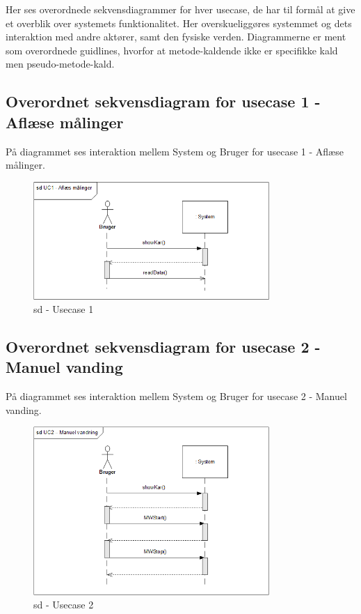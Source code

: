 
Her ses overordnede sekvensdiagrammer for hver usecase, de har til formål at give et overblik over systemets funktionalitet. Her overskueliggøres systemmet og dets interaktion med andre aktører, samt den fysiske verden.
Diagrammerne er ment som overordnede guidlines, hvorfor at metode-kaldende ikke er specifikke kald men pseudo-metode-kald. 

\subsection{Overordnet sekvensdiagram for usecase 1 - Aflæse målinger}
På diagrammet ses interaktion mellem System og Bruger for usecase 1 - Aflæse målinger.

\begin{figure}[H]
    \centering
    \includegraphics[width=0.8\textwidth]{Systemarkitektur/OverordnedeSekvensdiagrammer/sd_UC1.PNG}
    \caption{sd - Usecase 1}
    \label{fig:sd_UC1}
\end{figure}

\subsection{Overordnet sekvensdiagram for usecase 2 - Manuel vanding}
På diagrammet ses interaktion mellem System og Bruger for usecase 2 - Manuel vanding.

\begin{figure}[H]
    \centering
    \includegraphics[width=0.8\textwidth]{Systemarkitektur/OverordnedeSekvensdiagrammer/sd_UC2.PNG}
    \caption{sd - Usecase 2}
    \label{fig:sd_UC2}
\end{figure}


